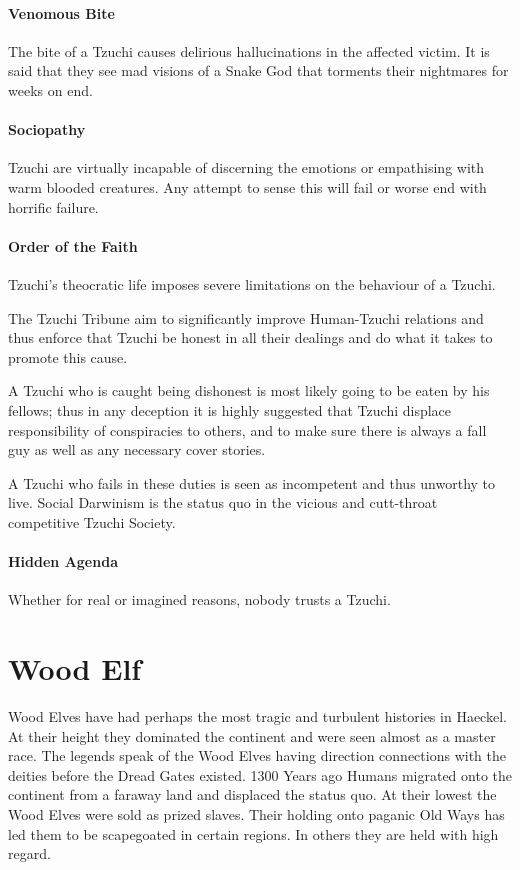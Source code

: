 \begin{multicols}{2}
    \paragraph{Venomous Bite} The bite of a Tzuchi causes delirious hallucinations in the affected victim. It is said that they see mad visions of a Snake God that torments their nightmares for weeks on end. 
    \paragraph{Sociopathy} Tzuchi are virtually incapable of discerning the emotions or empathising with warm blooded creatures. Any attempt to sense this will fail or worse end with horrific failure.
    \paragraph{Order of the Faith} Tzuchi's theocratic life imposes severe limitations on the behaviour of a Tzuchi. 
    
    The Tzuchi Tribune aim to significantly improve Human-Tzuchi relations and thus enforce that Tzuchi be honest in all their dealings and do what it takes to promote this cause. 
    
    A Tzuchi who is caught being dishonest is most likely going to be eaten by his fellows; thus in any deception it is highly suggested that Tzuchi displace responsibility of conspiracies to others, and to make sure there is always a fall guy as well as any necessary cover stories.
    
    A Tzuchi who fails in these duties is seen as incompetent and thus unworthy to live. Social Darwinism is the status quo in the vicious and cutt-throat competitive Tzuchi Society.  
    \paragraph{Hidden Agenda} Whether for real or imagined reasons, nobody trusts a Tzuchi. 
    
\section{Wood Elf} Wood Elves have had perhaps the most tragic and turbulent histories in Haeckel. At their height they dominated the continent and were seen almost as a master race. The legends speak of the Wood Elves having direction connections with the deities before the Dread Gates existed. 1300 Years ago Humans migrated onto the continent from a faraway land and displaced the status quo. At their lowest the Wood Elves were sold as prized slaves. Their holding onto paganic Old Ways has led them to be scapegoated in certain regions. In others they are held with high regard. 


\end{multicols}
